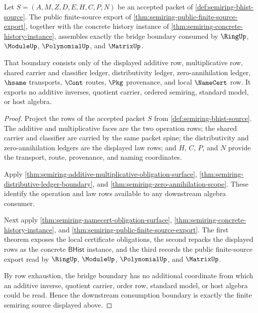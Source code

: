 \begin{theorem}
\label{thm:semiring-bridge-finite-source-downstream-consumption}
Let $S=(A,M,Z,D,E,H,C,P,N)$ be an accepted packet of \autoref{def:semiring-bhist-source}. The public finite-source export of \autoref{thm:semiring-public-finite-source-export}, together with the concrete history instance of \autoref{thm:semiring-concrete-history-instance}, assembles exactly the bridge boundary consumed by $\RingUp$, $\ModuleUp$, $\PolynomialUp$, and $\MatrixUp$.

That boundary consists only of the displayed additive row, multiplicative row, shared carrier and classifier ledger, distributivity ledger, zero-annihilation ledger, $\hsame$ transports, $\Cont$ routes, $\Pkg$ provenance, and local $\NameCert$ row. It exports no additive inverses, quotient carrier, ordered semiring, standard model, or host algebra.
\end{theorem}
\begin{proof}
Project the rows of the accepted packet $S$ from \autoref{def:semiring-bhist-source}. The additive and multiplicative faces are the two operation rows; the shared carrier and classifier are carried by the same packet spine; the distributivity and zero-annihilation ledgers are the displayed law rows; and $H$, $C$, $P$, and $N$ provide the transport, route, provenance, and naming coordinates.

Apply \autoref{thm:semiring-additive-multiplicative-obligation-surface}, \autoref{thm:semiring-distributive-ledger-boundary}, and \autoref{thm:semiring-zero-annihilation-scope}. These identify the operation and law rows available to any downstream algebra consumer.

Next apply \autoref{thm:semiring-namecert-obligation-surface}, \autoref{thm:semiring-concrete-history-instance}, and \autoref{thm:semiring-public-finite-source-export}. The first theorem exposes the local certificate obligations, the second repacks the displayed rows as the concrete $\mathsf{BHist}$ instance, and the third records the public finite-source export read by $\RingUp$, $\ModuleUp$, $\PolynomialUp$, and $\MatrixUp$.

By row exhaustion, the bridge boundary has no additional coordinate from which an additive inverse, quotient carrier, order row, standard model, or host algebra could be read. Hence the downstream consumption boundary is exactly the finite semiring source displayed above.
\end{proof}

